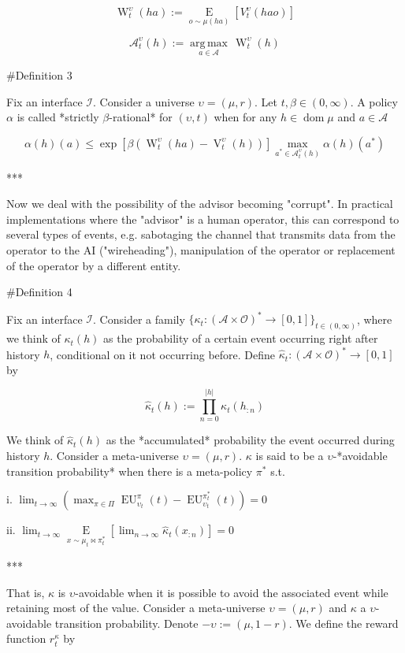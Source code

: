 \documentclass[a4paper]{article}
\DeclareMathOperator{\Dom}{dom}
\newcommand{\E}[1]{\underset{#1}{\operatorname{E}}}
\newcommand{\Argmax}[1]{\underset{#1}{\operatorname{arg\,max}}\,}
\newcommand{\Abs}[1]{\lvert #1 \rvert}
\newcommand{\Ob}{\mathcal{O}}
\newcommand{\A}{\mathcal{A}}
\newcommand{\I}{\mathcal{I}}
\newcommand{\FH}{(\A \times \Ob)^*}
\newcommand{\V}{\operatorname{V}}
\newcommand{\W}{\operatorname{W}}
\newcommand{\EU}{\operatorname{EU}}
\begin{document}
$$\W_t^\upsilon(ha):=\E{o \sim \mu(ha)}[V_t^\upsilon(hao)]$$

$$\A^\upsilon_t(h) := \Argmax{a \in \A} \W_t^\upsilon(h)$$

\#Definition 3

Fix an interface $\I$. Consider a universe $\upsilon=(\mu,r)$. Let $t,\beta \in (0,\infty)$. A policy $\alpha$ is called *strictly $\beta$-rational* for $(\upsilon,t)$ when for any $h \in \Dom{\mu}$ and $a \in \A$

$$\alpha(h)(a) \leq \exp{[\beta(\W^{\upsilon}_t(ha)-\V^\upsilon_t(h))]} \max_{a^* \in \A^\upsilon_t(h)} \alpha(h)(a^*)$$

***

Now we deal with the possibility of the advisor becoming "corrupt". In practical implementations where the "advisor" is a human operator, this can correspond to several types of events, e.g. sabotaging the channel that transmits data from the operator to the AI ("wireheading"), manipulation of the operator or replacement of the operator by a different entity.

\#Definition 4

Fix an interface $\I$. Consider a family $\{\kappa_t: \FH \rightarrow [0,1]\}_{t \in (0,\infty)}$, where we think of $\kappa_t(h)$ as the probability of a certain event occurring right after history $h$, conditional on it not occurring before. Define $\hat{\kappa}_t: \FH \rightarrow [0,1]$ by

$$\hat{\kappa}_t(h):= \prod_{n = 0}^{\Abs{h}} \kappa_t(h_{:n})$$

We think of $\hat{\kappa}_t(h)$ as the *accumulated* probability the event occurred during history $h$. Consider a meta-universe $\upsilon=(\mu,r)$. $\kappa$ is said to be a $\upsilon$-*avoidable transition probability* when there is a meta-policy $\pi^*$ s.t.

i. $\lim_{t \rightarrow \infty} {(\max_{\pi \in \Pi} \EU_{\upsilon_t}^{\pi}(t)-\EU_{\upsilon_t}^{\pi^*_t}(t))} = 0$

ii. $\lim_{t \rightarrow \infty} \E{x \sim \mu_t\bowtie\pi^*_t}[\lim_{n \rightarrow \infty} \hat{\kappa}_t(x_{:n})] = 0$

***

That is, $\kappa$ is $\upsilon$-avoidable when it is possible to avoid the associated event while retaining most of the value. Consider a meta-universe $\upsilon=(\mu,r)$ and $\kappa$ a $\upsilon$-avoidable transition probability. Denote $-\upsilon:=(\mu,1-r)$. We define the reward function $r^\kappa_t$ by
\end{document}
